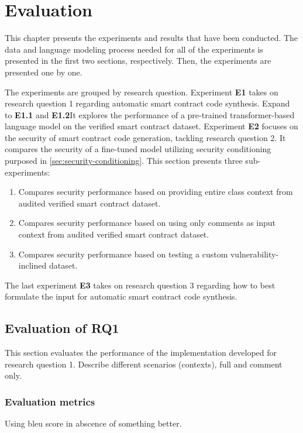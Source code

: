 
\chapter{Evaluation}
\label{chap:evaluation}
This chapter presents the experiments and results that have been conducted. The data and language modeling process needed for all of the experiments is presented in the first two sections, respectively. Then, the experiments are presented one by one. 

The experiments are grouped by research question. Experiment \textbf{E1} takes on research question 1 regarding automatic smart contract code synthesis. Expand to \textbf{E1.1} and \textbf{E1.2}It explores the performance of a pre-trained transformer-based language model on the verified smart contract dataset. Experiment \textbf{E2} focuses on the security of smart contract code generation, tackling research question 2. It compares the security of a fine-tuned model utilizing security conditioning purposed in \cref{sec:security-conditioning}. This section presents three sub-experiments:
\begin{enumerate}[label=\textbf{E2.\arabic*.}, leftmargin=1.5cm]
    \item Compares security performance based on providing entire class context from audited verified smart contract dataset.
    \item Compares security performance based on using only comments as input context from audited verified smart contract dataset.
    \item Compares security performance based on testing a custom vulnerability-inclined dataset.
\end{enumerate}
The last experiment \textbf{E3} takes on research question 3 regarding how to best formulate the input for automatic smart contract code synthesis.

\section{Evaluation of RQ1}
\label{sec:e1-automatic-smart-contract-code-synthesis}
This section evaluates the performance of the implementation developed for research question 1. Describe different scenarios  (contexts), full and comment only. 

\subsection{Evaluation metrics}
Using bleu score in abscence of something better.



